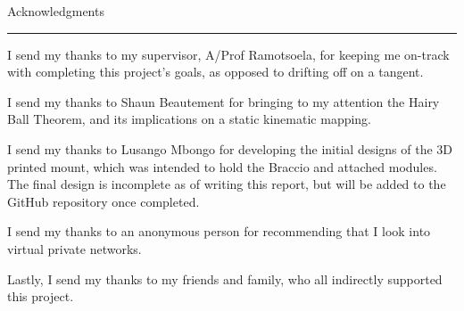 \fancyfoot[C]{\thepage}
\pagestyle{plain}
\newpage
{}
{\Large Acknowledgments}\\
\hrule
I send my thanks to my supervisor, A/Prof Ramotsoela, for keeping me on-track with completing this project's goals, as opposed to drifting off on a tangent.

I send my thanks to Shaun Beautement for bringing to my attention the Hairy Ball Theorem, and its implications on a static kinematic mapping.

I send my thanks to Lusango Mbongo for developing the initial designs of the 3D printed mount, which was intended to hold the Braccio and attached modules. The final design is incomplete as of writing this report, but will be added to the GitHub repository once completed.

I send my thanks to an anonymous person for recommending that I look into virtual private networks.

Lastly, I send my thanks to my friends and family, who all indirectly supported this project.

